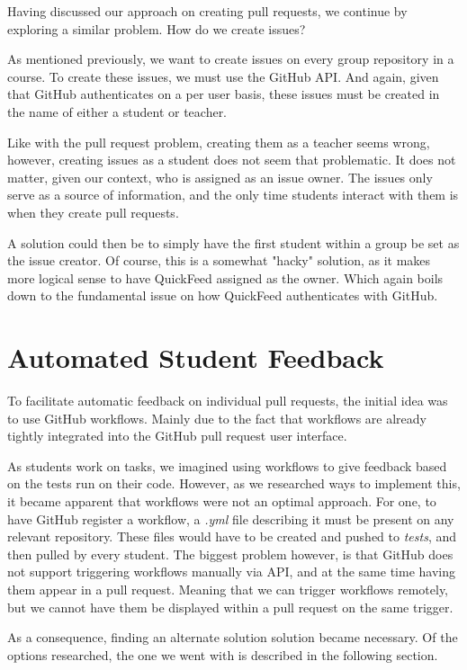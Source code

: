 Having discussed our approach on creating pull requests, we continue by exploring a similar problem.
How do we create issues?

As mentioned previously, we want to create issues on every group repository in a course.
To create these issues, we must use the GitHub API.
And again, given that GitHub authenticates on a per user basis, these issues must be created in the name of either a student or teacher.

Like with the pull request problem, creating them as a teacher seems wrong, however, creating issues as a student does not seem that problematic.
It does not matter, given our context, who is assigned as an issue owner.
The issues only serve as a source of information, and the only time students interact with them is when they create pull requests.

A solution could then be to simply have the first student within a group be set as the issue creator.
Of course, this is a somewhat "hacky" solution, as it makes more logical sense to have QuickFeed assigned as the owner.
Which again boils down to the fundamental issue on how QuickFeed authenticates with GitHub.

\section{Automated Student Feedback}

To facilitate automatic feedback on individual pull requests, the initial idea was to use GitHub workflows.
Mainly due to the fact that workflows are already tightly integrated into the GitHub pull request user interface.

As students work on tasks, we imagined using workflows to give feedback based on the tests run on their code.
However, as we researched ways to implement this, it became apparent that workflows were not an optimal approach.
For one, to have GitHub register a workflow, a \textit{.yml} file describing it must be present on any relevant repository.
These files would have to be created and pushed to \textit{tests}, and then pulled by every student.
The biggest problem however, is that GitHub does not support triggering workflows manually via API, and at the same time having them appear in a pull request.
Meaning that we can trigger workflows remotely, but we cannot have them be displayed within a pull request on the same trigger.

As a consequence, finding an alternate solution solution became necessary.
Of the options researched, the one we went with is described in the following section.

